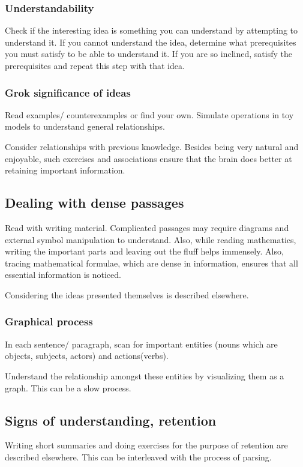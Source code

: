 \documentclass[oneside, article]{memoir}
\begin{document}
\subsubsection{Understandability}
Check if the interesting idea is something you can understand by attempting to understand it. If you cannot understand the idea, determine what prerequisites you must satisfy to be able to understand it. If you are so inclined, satisfy the prerequisites and repeat this step with that idea.

\subsubsection{Grok significance of ideas}
Read examples/ counterexamples or find your own. Simulate operations in toy models to understand general relationships.

Consider relationships with previous knowledge. Besides being very natural and enjoyable, such exercises and associations ensure that the brain does better at retaining important information.


\subsection{Dealing with dense passages}
Read with writing material. Complicated passages may require diagrams and external symbol manipulation to understand. Also, while reading mathematics, writing the important parts and leaving out the fluff helps immensely. Also, tracing mathematical formulae, which are dense in information, ensures that all essential information is noticed.

Considering the ideas presented themselves is described elsewhere.

\subsubsection{Graphical process}
In each sentence/ paragraph, scan for important entities (nouns which are objects, subjects, actors) and actions(verbs).

Understand the relationship amongst these entities by visualizing them as a graph. This can be a slow process.

\subsection{Signs of understanding, retention}
Writing short summaries and doing exercises for the purpose of retention are described elsewhere. This can be interleaved with the process of parsing.
\end{document}
